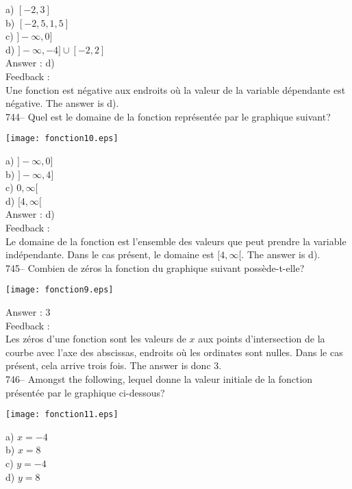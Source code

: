 ﻿\documentclass[letterpaper, 12pt]{article}
\begin{document}
a) $[-2, 3]$\\
b) $[-2,5, 1,5]$\\
c) $]-\infty,0]$\\
d) $]-\infty,-4]\cup[-2,2]$\\

Answer : d)\\

Feedback : \\
Une fonction est n\'egative aux endroits o\`u la valeur de la variable
d\'ependante est n\'egative.  The answer is d).\\

744-- Quel est le domaine de la fonction repr\'esent\'ee par le graphique
suivant?\\

    \begin{center}
    \texttt{[image: fonction10.eps]}
    \end{center}
a) $]-\infty,0]$\\
b) $]-\infty,4]$\\
c) $0,\infty[$\\
d) $[4, \infty[$\\

Answer : d)\\

Feedback : \\
Le domaine de la fonction est l'ensemble des valeurs que peut prendre la
variable ind\'ependante.  Dans le cas pr\'esent, le domaine est $[4,
\infty[$.  The answer is d).\\

745-- Combien de z\'eros la fonction du graphique suivant
poss\`ede-t-elle?\\
    \begin{center}
    \texttt{[image: fonction9.eps]}
    \end{center}

Answer : 3\\

Feedback : \\
Les z\'eros d'une fonction sont les valeurs de $x$ aux points d'intersection
de la courbe avec l'axe des abscissas, endroits o\`u les ordinates sont
nulles.  Dans le cas pr\'esent, cela arrive trois fois.  The answer is
donc 3.\\

746-- Amongst the following, lequel donne la valeur initiale de la
fonction pr\'esent\'ee par le graphique ci-dessous?\\
    \begin{center}
    \texttt{[image: fonction11.eps]}
    \end{center}
a) $x=-4$\\
b) $x=8$\\
c) $y=-4$\\
d) $y=8$\\
\end{document}
